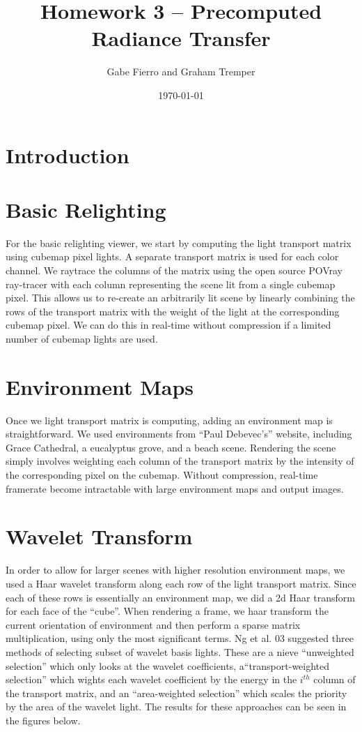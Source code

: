 \documentclass[11pt]{article}
\begin{document}
\title{Homework 3 -- Precomputed Radiance Transfer}
\author{Gabe Fierro and Graham Tremper}
\date{\today}
\maketitle

\section{Introduction}

\section{Basic Relighting}
For the basic relighting viewer, we start by computing the light transport matrix using cubemap pixel lights. A separate transport matrix is used for each color channel. We raytrace the columns of the matrix using the open source POVray ray-tracer with each column representing the scene lit from a single cubemap pixel. This allows us to re-create an arbitrarily lit scene by linearly combining the rows of the transport matrix with the weight of the light at the corresponding cubemap pixel. We can do this in real-time without compression if a limited number of cubemap lights are used.

\section{Environment Maps}
Once we light transport matrix is computing, adding an environment map is straightforward. We used environments from ``Paul Debevec's'' website, including Grace Cathedral, a eucalyptus grove, and a beach scene. Rendering the scene simply involves weighting each column of the transport matrix by the intensity of the corresponding pixel on the cubemap. Without compression, real-time framerate become intractable with large environment maps and output images.

\section{Wavelet Transform}
In order to allow for larger scenes with higher resolution environment maps, we used a Haar wavelet transform along each row of the light transport matrix. Since each of these rows is essentially an environment map, we did a 2d Haar transform for each face of the ``cube''. When rendering a frame, we haar transform the current orientation of environment and then perform a sparse matrix multiplication, using only the most significant terms. Ng et al. 03 suggested three methods of selecting subset of wavelet basis lights. These are a nieve ``unweighted selection'' which only looks at the wavelet coefficients, a``transport-weighted selection'' which wights each wavelet coefficient by the energy in the $i^{th}$ column of the transport matrix, and an ``area-weighted selection'' which scales the priority by the area of the wavelet light. The results for these approaches can be seen in the figures below.
\end{document}
